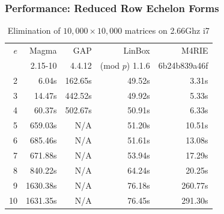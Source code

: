 \documentclass[11pt]{beamer}
\begin{document}
\begin{frame}
\frametitle{Performance: Reduced Row Echelon Forms}
\begin{table}[ht]
\begin{small}
\begin{center}
\begin{tabular}{|r|r|r|r|r|}
\hline
 $e$ & Magma & GAP & LinBox & M4RIE \\
     & {\footnotesize 2.15-10} & {\footnotesize 4.4.12} & (mod $p$) 1.1.6 & {\footnotesize 6b24b839a46f}\\
\hline
  2 &    6.04s &  162.65s & 49.52s &   3.31s\\
  3 &   14.47s &  442.52s & 49.92s &   5.33s\\
  4 &   60.37s &  502.67s & 50.91s &   6.33s\\
  5 &  659.03s &      N/A & 51.20s &  10.51s\\
  6 &  685.46s &      N/A & 51.61s &  13.08s\\
  7 &  671.88s &      N/A & 53.94s &  17.29s\\
  8 &  840.22s &      N/A & 64.24s &  20.25s\\
\hline
  9 & 1630.38s &      N/A & 76.18s & 260.77s\\
 10 & 1631.35s &      N/A & 76.45s & 291.30s\\
\hline
\end{tabular}
\end{center}
\end{small}
\caption{Elimination of $10,000 \times 10,000$ matrices on 2.66Ghz i7}
\label{tab:echelonform}
\end{table}
\end{frame}
\end{document}

